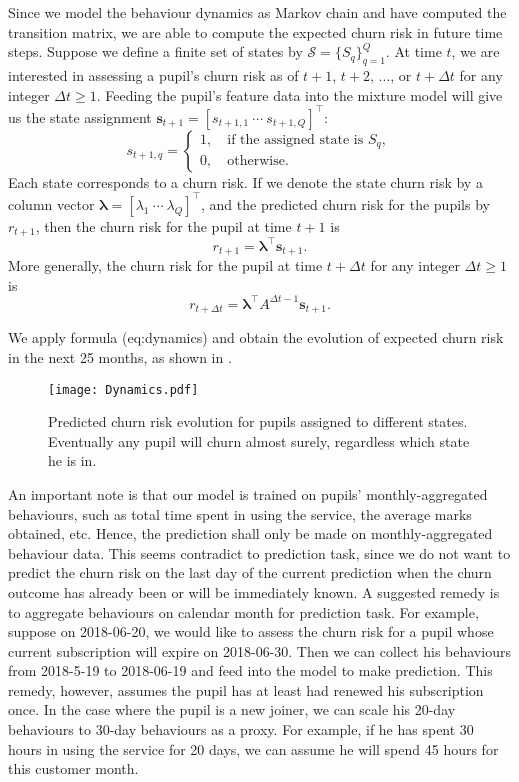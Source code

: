 Since we model the behaviour dynamics as Markov chain and have computed the transition matrix, we are able to compute the expected churn risk in future time steps. Suppose we define a finite set of states by $\mathcal{S} = \{S_q\}_{q=1}^Q$. At time $t$, we are interested in assessing a pupil's churn risk as of $t+1$, $t+2$, ..., or $t+\Delta t$ for any integer $\Delta t \geq 1$. Feeding the pupil's feature data into the mixture model will give us the state assignment $\mathbf{s}_{t+1} = [s_{t+1,1} ~\cdots ~s_{t+1,Q}]^\top $:
\begin{equation}
s_{t+1,q} = 
	\begin{cases}
	1, \quad \text{if the assigned state is } S_q, \\
	0, \quad \text{otherwise}. 
	\end{cases}
\end{equation}
Each state corresponds to a churn risk. If we denote the state churn risk by a column vector $\bm\lambda = [\lambda_1 ~\cdots ~\lambda_Q]^\top$, and the predicted churn risk for the pupils by $r_{t+1}$, then the churn risk for the pupil at time $t+1$ is
\begin{equation}
r_{t+1} = \bm\lambda^\top \mathbf{s}_{t+1}.
\end{equation}
More generally, the churn risk for the pupil at time $t+\Delta t$ for any integer $\Delta t \geq 1$ is
\begin{equation}
r_{t+\Delta t} = \bm\lambda^\top A^{\Delta t -1 } \mathbf{s}_{t+1}.
\label{eq:dynamics}
\end{equation}

We apply formula (eq:dynamics) and obtain the evolution of expected churn risk in the next 25 months, as shown in .

\begin{figure}[!h]
\centering
\texttt{[image: Dynamics.pdf]}
\caption{Predicted churn risk evolution for pupils assigned to different states. Eventually any pupil will churn almost surely, regardless which state he is in.}
\label{fig:dynamics}
\end{figure}

An important note is that our model is trained on pupils' monthly-aggregated behaviours, such as total time spent in using the service, the average marks obtained, etc. Hence, the prediction shall only be made on monthly-aggregated behaviour data. This seems contradict to prediction task, since we do not want to predict the churn risk on the last day of the current prediction when the churn outcome has already been or will be immediately known. A suggested remedy is to aggregate behaviours on calendar month for prediction task. For example, suppose on 2018-06-20, we would like to assess the churn risk for a pupil whose current subscription will expire on 2018-06-30. Then we can collect his behaviours from 2018-5-19 to 2018-06-19 and feed into the model to make prediction. This remedy, however, assumes the pupil has at least had renewed his subscription once. In the case where the pupil is a new joiner, we can scale his 20-day behaviours to 30-day behaviours as a proxy. For example, if he has spent 30 hours in using the service for 20 days, we can assume he will spend 45 hours for this customer month.

